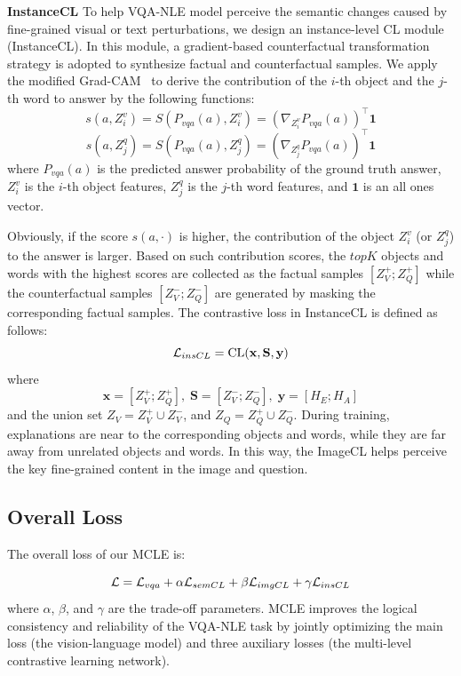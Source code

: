 \documentclass[letterpaper]{article} %
\begin{document}
\noindent
\textbf{InstanceCL} To help VQA-NLE model perceive the semantic changes caused by fine-grained visual or text perturbations, we design an instance-level CL module (InstanceCL). In this module, a gradient-based counterfactual transformation strategy is adopted to synthesize factual and counterfactual samples. We apply the modified Grad-CAM~\cite{selvaraju2017grad} to derive the contribution of the $i$-th object and the $j$-th word to answer by the following functions:
\begin{equation}
	s(a,Z^v_i) = S(P_{vqa}(a),Z^v_i)=(\nabla_{Z^v_i}P_{vqa}(a))^\top \mathbf{1}
\end{equation}
\begin{equation}
	s(a,Z^q_j) = S(P_{vqa}(a),Z^q_j)=(\nabla_{Z^q_j}P_{vqa}(a))^\top \mathbf{1}
\end{equation}
\noindent
where $P_{vqa}(a)$ is the predicted answer probability of the ground truth answer, $Z^v_i$ is the $i$-th object features, $Z^q_j$ is the $j$-th word features, and $\mathbf{1}$ is an all ones vector.

Obviously, if the score $s(a, \cdot)$ is higher, the contribution of the object $Z^v_i$ (or $Z^q_j$) to the answer is larger. Based on such contribution scores, the $topK$ objects and words with the highest scores are collected as the factual samples $[{Z^+_V;Z^+_Q}]$ while the counterfactual samples $[{Z^-_V;Z^-_Q}]$ are generated by masking the corresponding factual samples. The contrastive loss in InstanceCL is defined as follows:
\begin{equation}
	\mathcal{L}_{insCL} = \text{CL}(\mathbf{x},\mathbf{S},\mathbf{y})\\
\end{equation}
where
\begin{equation*}
	\mathbf{x}=[{Z^+_V;Z^+_Q}], \; \mathbf{S}=[{Z^-_V;Z^-_Q}], \; \mathbf{y}=[{H_E;H_A}]
\end{equation*}
and the union set $Z_V = Z^+_V \cup Z^-_V$, and  $Z_Q = Z^+_Q \cup Z^-_Q$. During training, explanations are near to the corresponding objects and words, while they are far away from unrelated objects and words. In this way, the ImageCL helps perceive the key fine-grained content in the image and question.

\subsection{Overall Loss}
The overall loss of our MCLE is:

\begin{equation}
	\mathcal{L} =\mathcal{L}_{vqa}+	\alpha \mathcal{L}_{semCL}+\beta \mathcal{L}_{imgCL}+\gamma	\mathcal{L}_{insCL}\\
\end{equation}
\noindent
where $\alpha$, $\beta$, and $\gamma$ are the trade-off parameters. MCLE improves the logical consistency and reliability of the VQA-NLE task by jointly optimizing the main loss (the vision-language model) and three auxiliary losses (the multi-level contrastive learning network).
\end{document}
